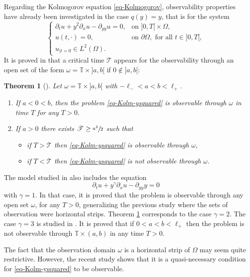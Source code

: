 \documentclass[JEP,XML,SOM,Unicode]{cedram}
\let\mathcal\mathscr
\theoremstyle{plain}
\newtheorem{theorem}{{Theorem}}[section]
\theoremstyle{definition}
\newcommand{\1}{\mathds 1}
\newcommand{\T}{\mathbb{T}}
\let\O\Omega
\newcommand{\Tc}{{\mathcal T}}
\begin{document}
Regarding the Kolmogorov equation \eqref{eq-Kolmogorov}, observability properties have already been investigated in the
case $q(y) = y$, that is for the system
\begin{equation} \label{eq-Kolm-ysquared}
\begin{cases}
\partial_t u + y^2 \partial_x u - \partial_{yy} u = 0, & \text{on } ]0,T[{}\times \O,\\
u(t,\cdot) = 0, & \text{on } \partial\O, \text{ for all } t \in{}]0,T[,\\
u_{|t=0} \in L^2 (\O).
\end{cases}
\end{equation}
It is proved in \cite{Beauchard14} that a critical time $\Tc$ appears for the observability through an open set of the form $\omega = \T\times{}]a,b[$ if $0 \notin{}]a,b[$:

\begin{theorem}[\cite{Beauchard14}] \label{th-KB}
Let $\omega = \T \times{}]a,b[$ with $-\ell_- < a < b< \ell_+$.
\begin{enumerate}
\item If $a < 0 < b$, then the problem \eqref{eq-Kolm-ysquared} is observable through $\omega$ in time $T$ for any $T>0$.
\item If $a > 0$ there exists $\Tc \geq \sfrac{a^2}{2}$ such that
\begin{itemize}
\item if $T > \Tc$ then \eqref{eq-Kolm-ysquared} is observable through $\omega$,
\item if $T < \Tc$ then \eqref{eq-Kolm-ysquared} is not observable through $\omega$.
\end{itemize}
\end{enumerate}
\end{theorem}

The model studied in \cite{Beauchard14} also includes the equation
\[
\partial_t u + y^\gamma \partial_{x} u - \partial_{yy} y = 0
\]
with $\gamma = 1$. In that case, it is proved that the problem is observable through any open set $\omega$, for any $T > 0$, generalizing the previous study \cite{Beauchard_Zuazua_09} where the sets of observation were horizontal strips. Theorem \ref{th-KB} corresponds to the case $\gamma = 2$. The case $\gamma = 3$ is studied in \cite{beauchard_henry}. It is proved that if $0<a<b< \ell_+$ then the problem is not observable through $\T \times (a,b)$ in any time $T>0$.

The fact that the observation domain $\omega$ is a horizontal strip of $\O$ may seem quite restrictive. However,
the recent study \cite{koenig18} shows that it is a quasi-necessary condition for \eqref{eq-Kolm-ysquared} to be observable.
\end{document}
